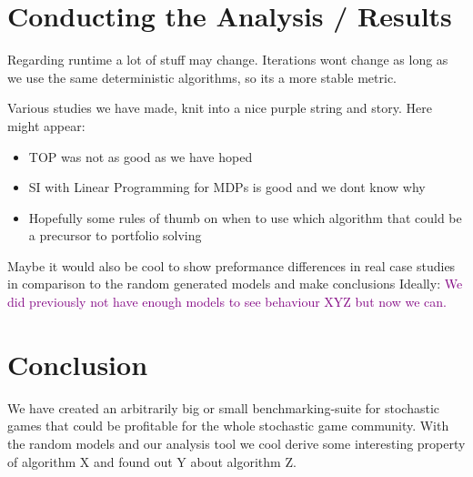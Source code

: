 \chapter{Conducting the Analysis / Results}
Regarding runtime a lot of stuff may change. Iterations wont change as long as we use the same deterministic algorithms, so its a more stable metric.

Various studies we have made, knit into a nice purple string and story. Here might appear:
\begin{itemize}
\item TOP was not as good as we have hoped
\item SI with Linear Programming for MDPs is good and we dont know why
\item Hopefully some rules of thumb on when to use which algorithm that could be a precursor to portfolio solving
\end{itemize}

Maybe it would also be cool to show preformance differences in real case studies in comparison to the random generated models and make conclusions Ideally: \textcolor{purple}{We did previously not have enough models to see behaviour XYZ but now we can.}

\chapter{Conclusion}
We have created an arbitrarily big or small benchmarking-suite for stochastic games that could be profitable for the whole stochastic game community. With the random models and our analysis tool we cool derive some interesting property of algorithm X and found out Y about algorithm Z.